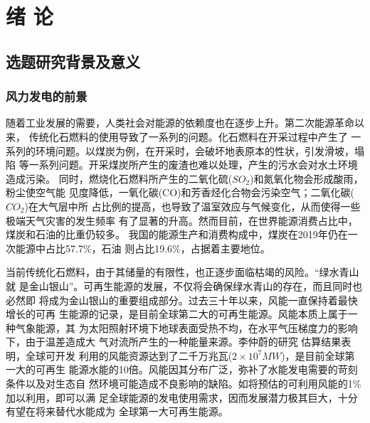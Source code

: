 \documentclass[AutoFakeBold]{LZUThesis}
\begin{document}
\tableofcontents

\begingroup
{}
\renewcommand{\addvspace}[1]{}
\newcommand{\loflabel}{图} 
\renewcommand{\numberline}[1]{\loflabel~#1\hspace*{1em}}
\listoffigures
\thispagestyle{empty}

\newcommand{\lotlabel}{表}
\renewcommand{\numberline}[1]{\lotlabel~#1\hspace*{1em}}
\listoftables
\thispagestyle{empty}
\clearpage
\endgroup

\mainmatter

\chapter{绪 \qquad 论}


\section{选题研究背景及意义}
\subsection{风力发电的前景}
随着工业发展的需要，人类社会对能源的依赖度也在逐步上升。第二次能源革命以来，
传统化石燃料的使用导致了一系列的问题。化石燃料在开采过程中产生了
一系列的环境问题。以煤炭为例，在开采时，会破坏地表原本的性状，引发滑坡，塌陷
等一系列问题。开采煤炭所产生的废渣也难以处理，产生的污水会对水土环境造成污染。
同时，燃烧化石燃料所产生的二氧化硫($SO_2$)和氮氧化物会形成酸雨，粉尘使空气能
见度降低，一氧化碳(CO)和芳香烃化合物会污染空气；二氧化碳($CO_2$)在大气层中所
占比例的提高，也导致了温室效应与气候变化，从而使得一些极端天气灾害的发生频率
有了显著的升高。然而目前，在世界能源消费占比中，煤炭和石油的比重仍较多。
我国的能源生产和消费构成中，煤炭在2019年仍在一次能源中占比57.7\%，石油
则占比19.6\%，占据着主要地位。

当前传统化石燃料，由于其储量的有限性，也正逐步面临枯竭的风险。“绿水青山就
是金山银山”。可再生能源的发展，不仅将会确保绿水青山的存在，而且同时也必然即
将成为金山银山的重要组成部分。过去三十年以来，风能一直保持着最快增长的可再
生能源的记录，是目前全球第二大的可再生能源。风能本质上属于一种气象能源，其
为太阳照射环境下地球表面受热不均，在水平气压梯度力的影响下，由于温差造成大
气对流所产生的一种能量来源。李仲蔚的研究
估算结果表明，全球可开发
利用的风能资源达到了二千万兆瓦($2\times10^7MW$)，是目前全球第一大的可再生
能源水能的10倍。风能因其分布广泛，弥补了水能发电需要的苛刻条件以及对生态自
然环境可能造成不良影响的缺陷。如将预估的可利用风能的1\%加以利用，即可以满
足全球能源的发电使用需求，因而发展潜力极其巨大，十分有望在将来替代水能成为
全球第一大可再生能源。
\end{document}
